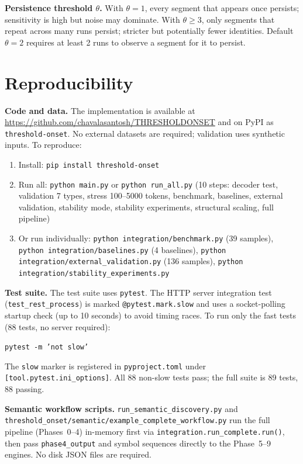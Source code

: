 \textbf{Persistence threshold $\theta$.}
With $\theta=1$, every segment that appears once persists; sensitivity is high but noise may dominate. With $\theta \geq 3$, only segments that repeat across many runs persist; stricter but potentially fewer identities. Default $\theta=2$ requires at least 2 runs to observe a segment for it to persist.

\section{Reproducibility}

\textbf{Code and data.}
The implementation is available at \url{https://github.com/chavalasantosh/THRESHOLDONSET} and on PyPI as \texttt{threshold-onset}. No external datasets are required; validation uses synthetic inputs. To reproduce:

\begin{enumerate}
\item Install: \texttt{pip install threshold-onset}
\item Run all: \texttt{python main.py} or \texttt{python run\_all.py} (10 steps: decoder test, validation 7 types, stress 100--5000 tokens, benchmark, baselines, external validation, stability mode, stability experiments, structural scaling, full pipeline)
\item Or run individually: \texttt{python integration/benchmark.py} (39 samples), \texttt{python integration/baselines.py} (4 baselines), \texttt{python integration/external\_validation.py} (136 samples), \texttt{python integration/stability\_experiments.py}
\end{enumerate}

\textbf{Test suite.}
The test suite uses \texttt{pytest}. The HTTP server integration test (\texttt{test\_rest\_process}) is marked \texttt{@pytest.mark.slow} and uses a socket-polling startup check (up to 10 seconds) to avoid timing races. To run only the fast tests (88 tests, no server required):
\begin{center}
\texttt{pytest -m 'not slow'}
\end{center}
The \texttt{slow} marker is registered in \texttt{pyproject.toml} under \texttt{[tool.pytest.ini\_options]}. All 88 non-slow tests pass; the full suite is 89 tests, 88 passing.

\textbf{Semantic workflow scripts.}
\texttt{run\_semantic\_discovery.py} and \texttt{threshold\_onset/semantic/example\_complete\_workflow.py} run the full pipeline (Phases~0--4) in-memory first via \texttt{integration.run\_complete.run()}, then pass \texttt{phase4\_output} and symbol sequences directly to the Phase~5--9 engines. No disk JSON files are required.

